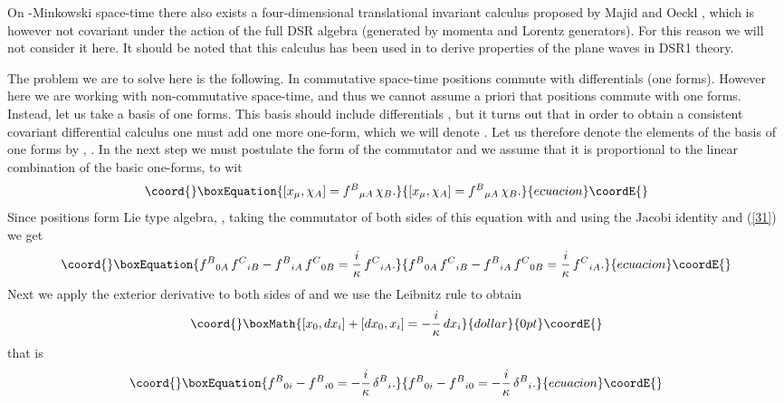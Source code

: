 \documentclass  [12pt] {article}
\begin{document}
On \myHighlight{$\kappa$}\coordHE{}-Minkowski space-time there also exists
 a four-dimensional translational invariant calculus proposed by Majid and Oeckl
\cite{majid}, which is however not covariant under the action of the full DSR
algebra (generated by momenta and Lorentz generators). For this reason we will
not consider it here. It should be noted that this calculus has been used in
\cite{Amelino-Camelia:2002tc} to derive properties of the plane waves in DSR1
theory.
\newline

The problem we are to solve here is the following. In commutative space-time
positions commute with differentials (one forms). However here we are working
with non-commutative space-time, and thus we cannot assume a priori that
positions commute with one forms. Instead, let us take a basis of one forms.
This basis should include differentials \coordHE{}, but it turns out that in
order to obtain a consistent covariant differential calculus one must add  one
more one-form, which we will denote \myHighlight{$\phi$}\coordHE{}. Let us therefore denote the
elements of the basis of one forms by \coordHE{}, \coordHE{}. In the next step we must postulate the form of the commutator
\myHighlight{$[x_\mu,\chi_A]$}\coordHE{} and we assume that it is proportional to the linear
combination of the basic one-forms, to wit
\begin{equation}\coord{}\boxEquation{\label{31}
[x_\mu,\chi_A] = f^{B}{}_{\mu A}\, \chi_B.
}{[x_\mu,\chi_A] = f^{B}{}_{\mu A}\, \chi_B.
}{ecuacion}\coordE{}\end{equation}
Since positions form Lie type algebra, \coordHE{},
 taking the commutator of both sides of this equation with \coordHE{} and using
the Jacobi identity and (\ref{31}) we get
\begin{equation}\coord{}\boxEquation{\label{32}
f^{B}{}_{0 A}\, f^{C}{}_{i B}-f^{B}{}_{i A}\, f^{C}{}_{0 B} =\frac{i}\kappa\,
f^{C}{}_{i A}.
}{f^{B}{}_{0 A}\, f^{C}{}_{i B}-f^{B}{}_{i A}\, f^{C}{}_{0 B} =\frac{i}\kappa\,
f^{C}{}_{i A}.
}{ecuacion}\coordE{}\end{equation}
Next we apply the exterior derivative to both sides of \coordHE{} and we use the Leibnitz rule to obtain
$$\coord{}\boxMath{
[x_0, dx_i]+[dx_0, x_i]  = -\frac{i}\kappa\, dx_i
}{dollar}{0pt}\coordE{}$$
that is
\begin{equation}\coord{}\boxEquation{\label{33}
 f^{B}{}_{0i} -f^{B}{}_{i0} =-\frac{i}\kappa\, \delta^B{}_i.
}{f^{B}{}_{0i} -f^{B}{}_{i0} =-\frac{i}\kappa\, \delta^B{}_i.
}{ecuacion}\coordE{}\end{equation}
\end{document}
